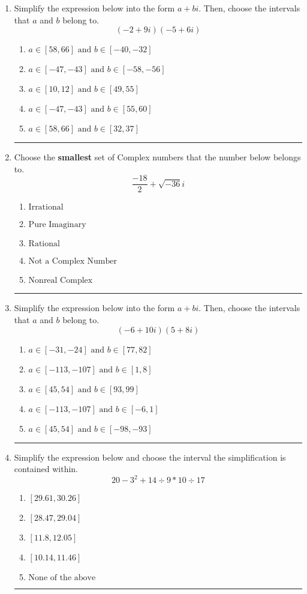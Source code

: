 \documentclass[14pt]{extbook}
\newcommand{\litem}[1]{\item#1\hspace*{-1cm}\rule{\textwidth}{0.4pt}}
\begin{document}
\begin{enumerate}
{\begin{enumerate}[label=\Alph*.]
\end{enumerate} }
\litem{
Simplify the expression below into the form $a+bi$. Then, choose the intervals that $a$ and $b$ belong to.\[ (-2 + 9 i)(-5 + 6 i) \]\begin{enumerate}[label=\Alph*.]
\item \( a \in [58, 66] \text{ and } b \in [-40, -32] \)
\item \( a \in [-47, -43] \text{ and } b \in [-58, -56] \)
\item \( a \in [10, 12] \text{ and } b \in [49, 55] \)
\item \( a \in [-47, -43] \text{ and } b \in [55, 60] \)
\item \( a \in [58, 66] \text{ and } b \in [32, 37] \)

\end{enumerate} }
\litem{
Choose the \textbf{smallest} set of Complex numbers that the number below belongs to.\[ \frac{-18}{2}+\sqrt{-36}i \]\begin{enumerate}[label=\Alph*.]
\item \( \text{Irrational} \)
\item \( \text{Pure Imaginary} \)
\item \( \text{Rational} \)
\item \( \text{Not a Complex Number} \)
\item \( \text{Nonreal Complex} \)

\end{enumerate} }
\litem{
Simplify the expression below into the form $a+bi$. Then, choose the intervals that $a$ and $b$ belong to.\[ (-6 + 10 i)(5 + 8 i) \]\begin{enumerate}[label=\Alph*.]
\item \( a \in [-31, -24] \text{ and } b \in [77, 82] \)
\item \( a \in [-113, -107] \text{ and } b \in [1, 8] \)
\item \( a \in [45, 54] \text{ and } b \in [93, 99] \)
\item \( a \in [-113, -107] \text{ and } b \in [-6, 1] \)
\item \( a \in [45, 54] \text{ and } b \in [-98, -93] \)

\end{enumerate} }
\litem{
Simplify the expression below and choose the interval the simplification is contained within.\[ 20 - 3^2 + 14 \div 9 * 10 \div 17 \]\begin{enumerate}[label=\Alph*.]
\item \( [29.61, 30.26] \)
\item \( [28.47, 29.04] \)
\item \( [11.8, 12.05] \)
\item \( [10.14, 11.46] \)
\item \( \text{None of the above} \)


\end{enumerate}}
\end{enumerate}
\end{document}
